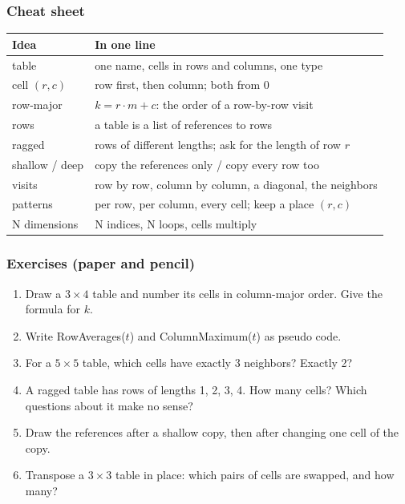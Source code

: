 \documentclass[aspectratio=169,10pt,compress]{beamer}
\begin{document}
\begin{frame}[t,fragile] \frametitle{Cheat sheet}


\begin{table}
		\small
		\begin{tabular}{@{}L{0.26\textwidth}L{0.66\textwidth}@{}}
			\toprule
			\textbf{Idea} & \textbf{In one line} \\
			\midrule
			table          & one name, cells in rows and columns, one type \\
			cell $(r, c)$   & row first, then column; both from 0 \\
			row-major      & $k = r \cdot m + c$: the order of a row-by-row visit \\
			rows           & a table is a list of references to rows \\
			ragged         & rows of different lengths; ask for the length of row $r$ \\
			shallow / deep & copy the references only / copy every row too \\
			visits         & row by row, column by column, a diagonal, the neighbors \\
			patterns       & per row, per column, every cell; keep a place $(r, c)$ \\
			N dimensions   & N indices, N loops, cells multiply \\
			\bottomrule
		\end{tabular}
\end{table}%
\end{frame}




\begin{frame}[t,fragile] \frametitle{Exercises (paper and pencil)}
	\begin{enumerate}\small
		\item Draw a $3 \times 4$ table and number its cells in column-major order. Give the formula for $k$.
		\item Write RowAverages($t$) and ColumnMaximum($t$) as pseudo code.
		\item For a $5 \times 5$ table, which cells have exactly 3 neighbors? Exactly 2?
		\item A ragged table has rows of lengths 1, 2, 3, 4. How many cells? Which questions about it make no sense?
		\item Draw the references after a shallow copy, then after changing one cell of the copy.
		\item Transpose a $3 \times 3$ table in place: which pairs of cells are swapped, and how many?
	\end{enumerate}
\end{frame}
\end{document}
